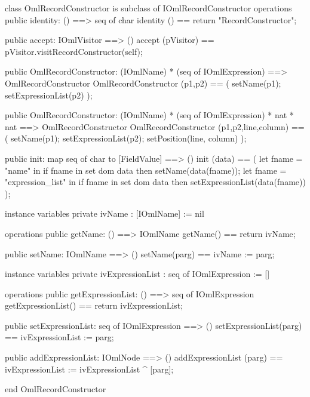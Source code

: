 \begin{vdm_al}
class OmlRecordConstructor is subclass of IOmlRecordConstructor
operations
  public identity: () ==> seq of char
  identity () == return "RecordConstructor";

  public accept: IOmlVisitor ==> ()
  accept (pVisitor) == pVisitor.visitRecordConstructor(self);

  public OmlRecordConstructor:
    (IOmlName) *
    (seq of IOmlExpression) ==> OmlRecordConstructor
  OmlRecordConstructor (p1,p2) == 
    ( setName(p1);
      setExpressionList(p2) );

  public OmlRecordConstructor:
    (IOmlName) *
    (seq of IOmlExpression) *
    nat *
    nat ==> OmlRecordConstructor
  OmlRecordConstructor (p1,p2,line,column) == 
    ( setName(p1);
      setExpressionList(p2);
      setPosition(line, column) );

  public init: map seq of char to [FieldValue] ==> ()
  init (data) ==
    ( let fname = "name" in
        if fname in set dom data
        then setName(data(fname));
      let fname = "expression_list" in
        if fname in set dom data
        then setExpressionList(data(fname)) );

instance variables
  private ivName : [IOmlName] := nil

operations
  public getName: () ==> IOmlName
  getName() == return ivName;

  public setName: IOmlName ==> ()
  setName(parg) == ivName := parg;

instance variables
  private ivExpressionList : seq of IOmlExpression := []

operations
  public getExpressionList: () ==> seq of IOmlExpression
  getExpressionList() == return ivExpressionList;

  public setExpressionList: seq of IOmlExpression ==> ()
  setExpressionList(parg) == ivExpressionList := parg;

  public addExpressionList: IOmlNode ==> ()
  addExpressionList (parg) == ivExpressionList := ivExpressionList ^ [parg];

end OmlRecordConstructor
\end{vdm_al}

